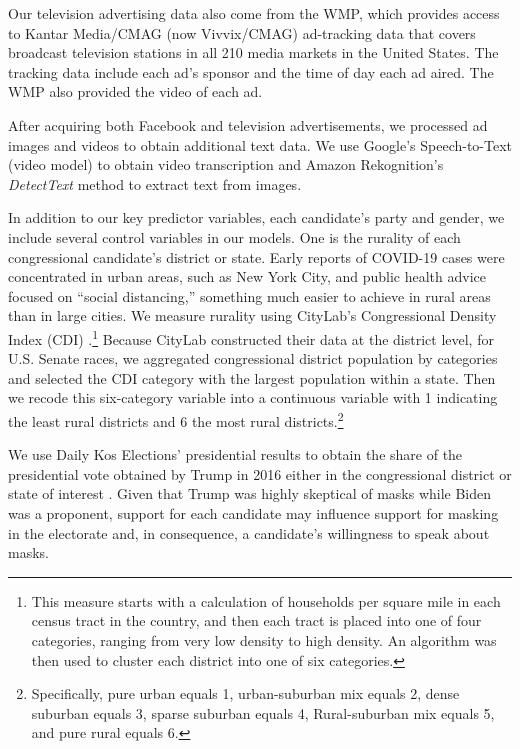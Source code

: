 Our television advertising data also come from the WMP, which provides access to Kantar Media/CMAG (now Vivvix/CMAG) ad-tracking data that covers broadcast television stations in all 210 media markets in the United States. The tracking data include each ad's sponsor and the time of day each ad aired. The WMP also provided the video of each ad. 

After acquiring both Facebook and television advertisements, we processed ad images and videos to obtain additional text data. We use Google's Speech-to-Text (video model) to obtain video transcription and Amazon Rekognition's \textit{DetectText} method to extract text from images. 

In addition to our key predictor variables, each candidate's party and gender, we include several control variables in our models.  One is the rurality of each congressional candidate's district or state. Early reports of COVID-19 cases were concentrated in urban areas, such as New York City, and public health advice focused on ``social distancing,'' something much easier to achieve in rural areas than in large cities.  We measure rurality using CityLab's Congressional Density Index (CDI) \parencite{montgomery2020}.\footnote{This measure starts with a calculation of households per square mile in each census tract in the country, and then each tract is placed into one of four categories, ranging from very low density to high density. An algorithm was then used to cluster each district into one of six categories.}  Because CityLab constructed their data at the district level, for U.S. Senate races, we aggregated congressional district population \parencite{us2020american} by categories and selected the CDI category with the largest population within a state. Then we recode this six-category variable into a continuous variable with 1 indicating the least rural districts and 6 the most rural districts.\footnote{Specifically, pure urban equals 1, urban-suburban mix equals 2, dense suburban equals 3, sparse suburban equals 4, Rural-suburban mix equals 5, and pure rural equals 6.} 

We use Daily Kos Elections' presidential results to obtain the share of the presidential vote obtained by Trump in 2016 either in the congressional district or state of interest \parencite{dailykos2016}.  Given that Trump was highly skeptical of masks while Biden was a proponent, support for each candidate may influence support for masking in the electorate and, in consequence, a candidate's willingness to speak about masks.


